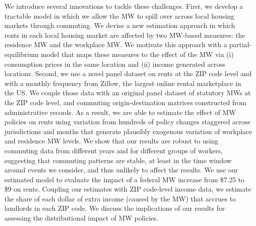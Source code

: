 We introduce several innovations to tackle these challenges.
First, we develop a tractable model in which we allow the MW to spill over 
across local housing markets through commuting.
We devise a new estimation approach in which rents in each local
housing market are affected by two MW-based measures:
the residence MW and the workplace MW.
We motivate this approach with a partial-equilibrium model
that maps these measures to the effect of the MW via 
(i) consumption prices in the same location and
(ii) income generated across locations.
Second, we use a novel panel dataset on rents at the ZIP code level and with 
a monthly frequency from Zillow, the largest online rental marketplace in the US.
We couple those data with an original panel dataset of statutory MWs 
at the ZIP code level, and commuting origin-destination matrices constructed
from administrative records.
As a result, we are able to estimate the effect of MW policies on rents using 
variation from hundreds of policy changes staggered across jurisdictions and 
months that generate plausibly exogenous variation of workplace and residence 
MW levels.
We show that our results are robust to using commuting data from different years
and for different groups of workers, suggesting that commuting patterns are 
stable, at least in the time window around events we consider, and thus unlikely
to affect the results.
We use our estimated model to evaluate the impact of a federal MW increase 
from \$7.25 to \$9 on rents.
Coupling our estimates with ZIP code-level income data, we estimate the share of 
each dollar of extra income (caused by the MW) that accrues to landlords in each 
ZIP code.
We discuss the implications of our results for assessing the distributional 
impact of MW policies.


